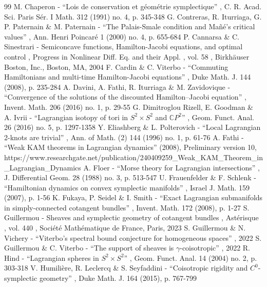 \documentclass[10pt]{amsart}
\theoremstyle{definition}
\begin{document}
\begin{thebibliography}{99}
 M. Chaperon - “Lois de conservation et géométrie symplectique” , C. R. Acad. Sci. Paris Sér. I Math. 312 (1991) no. 4, p. 345-348
 G. Contreras, R. Iturriaga, G. P. Paternain \& M. Paternain - “The Palais-Smale condition and Mañé’s critical values” , Ann. Henri Poincaré 1 (2000) no. 4, p. 655-684
 P. Cannarsa \& C. Sinestrari - Semiconcave functions, Hamilton-Jacobi equations, and optimal control , Progress in Nonlinear Diff. Eq. and their Appl. , vol. 58 , Birkhäuser Boston, Inc., Boston, MA, 2004
 F. Cardin \& C. Viterbo - “Commuting Hamiltonians and multi-time Hamilton-Jacobi equations” , Duke Math. J. 144 (2008), p. 235-284
 A. Davini, A. Fathi, R. Iturriaga \& M. Zavidovique - “Convergence of the solutions of the discounted Hamilton–Jacobi equation” , Invent. Math. 206 (2016) no. 1, p. 29-55
 G. Dimitroglou Rizell, E. Goodman \& A. Ivrii - “Lagrangian isotopy of tori in ${S^2\times S^2}$ and ${{\mathbb{C}}P^2}$” , Geom. Funct. Anal. 26 (2016) no. 5, p. 1297-1358
 Y. Eliashberg \& L. Polterovich - “Local Lagrangian 2-knots are trivial” , Ann. of Math. (2) 144 (1996) no. 1, p. 61-76
 A. Fathi - “Weak KAM theorems in Lagrangian dynamics” (2008), Preliminary version 10, https://www.researchgate.net/publication/240409259\_Weak\_KAM\_Theorem\_in\_Lagrangian\_Dynamics
 A. Floer - “Morse theory for Lagrangian intersections” , J. Differential Geom. 28 (1988) no. 3, p. 513-547
 U. Frauenfelder \& F. Schlenk - “Hamiltonian dynamics on convex symplectic manifolds” , Israel J. Math. 159 (2007), p. 1-56
 K. Fukaya, P. Seidel \& I. Smith - “Exact Lagrangian submanifolds in simply-connected cotangent bundles” , Invent. Math. 172 (2008), p. 1-27
 S. Guillermou - Sheaves and symplectic geometry of cotangent bundles , Astérisque , vol. 440 , Société Mathématique de France, Paris, 2023
 S. Guillermou \& N. Vichery - “Viterbo’s spectral bound conjecture for homogeneous spaces” , 2022
 S. Guillermou \& C. Viterbo - “The support of sheaves is $\gamma $-coisotropic” , 2022
 R. Hind - “Lagrangian spheres in $S^2\times S^2$” , Geom. Funct. Anal. 14 (2004) no. 2, p. 303-318
 V. Humilière, R. Leclercq \& S. Seyfaddini - “Coisotropic rigidity and $C^{0}$-symplectic geometry” , Duke Math. J. 164 (2015), p. 767-799

\end{thebibliography}
\end{document}
